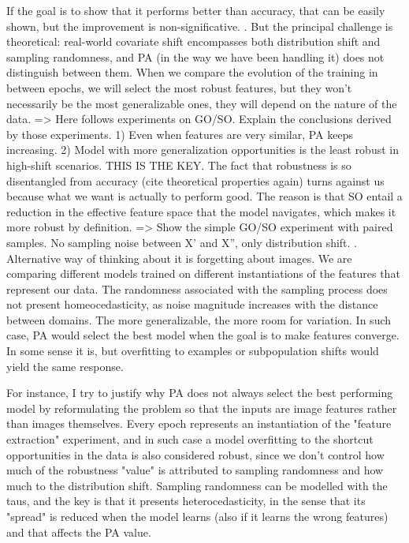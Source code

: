 If the goal is to show that it performs better than accuracy, that can be easily shown, but the improvement is non-significative.
. But the principal challenge is theoretical: real-world covariate shift encompasses both distribution shift and sampling randomness, and PA (in the way we have been handling it) does not distinguish between them. When we compare the evolution of the training in between epochs, we will select the most robust features, but they won't necessarily be the most generalizable ones, they will depend on the nature of the data.
=> Here follows experiments on GO/SO. Explain the conclusions derived by those experiments.
    1) Even when features are very similar, PA keeps increasing.
    2) Model with more generalization opportunities is the least robust in high-shift scenarios. THIS IS THE KEY. The fact that robustness is so disentangled from accuracy (cite theoretical properties again) turns against us because what we want is actually to perform good. The reason is that SO entail a reduction in the effective feature space that the model navigates, which makes it more robust by definition.
=> Show the simple GO/SO experiment with paired samples. No sampling noise between X' and X'', only distribution shift.
. Alternative way of thinking about it is forgetting about images. We are comparing different models
 trained on different instantiations of the features that represent our data. The randomness 
 associated with the sampling process does not present homeocedasticity, as noise magnitude 
 increases with the distance between domains. The more generalizable, the more room for variation. 
 In such case, PA would select the best model when the goal is to make features converge. In some 
 sense it is, but overfitting to examples or subpopulation shifts would yield the same response.

 For instance, I try to justify why PA does not always select the best performing model by reformulating the problem so that the inputs are image features rather than images themselves. Every epoch represents an instantiation of the "feature extraction" experiment, and in such case a model overfitting to the shortcut opportunities in the data is also considered robust, since we don't control how much of the robustness "value" is attributed to sampling randomness and how much to the distribution shift. Sampling randomness can be modelled with the taus, and the key is that it presents heterocedasticity, in the sense that its "spread" is reduced when the model learns (also if it learns the wrong features) and that affects the PA value.

